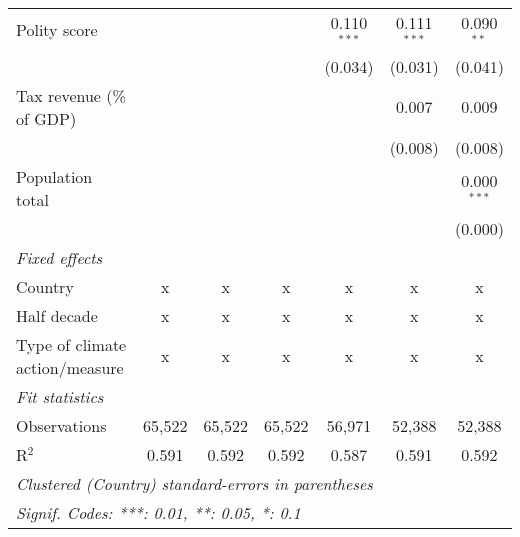 \begin{tabular}{lcccccc}
   Polity score                                                   &         &                &                & 0.110$^{***}$  & 0.111$^{***}$  & 0.090$^{**}$\\   
                                                                  &         &                &                & (0.034)        & (0.031)        & (0.041)\\   
   Tax revenue (\% of GDP)                                        &         &                &                &                & 0.007          & 0.009\\   
                                                                  &         &                &                &                & (0.008)        & (0.008)\\   
   Population total                                               &         &                &                &                &                & 0.000$^{***}$\\   
                                                                  &         &                &                &                &                & (0.000)\\   
   \emph{Fixed effects}\\
   Country                                                        & x       & x              & x              & x              & x              & x\\  
   Half decade                                                    & x       & x              & x              & x              & x              & x\\  
   Type of climate action/measure                                 & x       & x              & x              & x              & x              & x\\  
   \midrule \emph{Fit statistics}\\
   Observations                                                   & 65,522  & 65,522         & 65,522         & 56,971         & 52,388         & 52,388\\  
   R$^2$                                                          & 0.591   & 0.592          & 0.592          & 0.587          & 0.591          & 0.592\\  
   \midrule
   \multicolumn{7}{l}{\emph{Clustered (Country) standard-errors in parentheses}}\\
   \multicolumn{7}{l}{\emph{Signif. Codes: ***: 0.01, **: 0.05, *: 0.1}}\\
\end{tabular}
\par\endgroup


